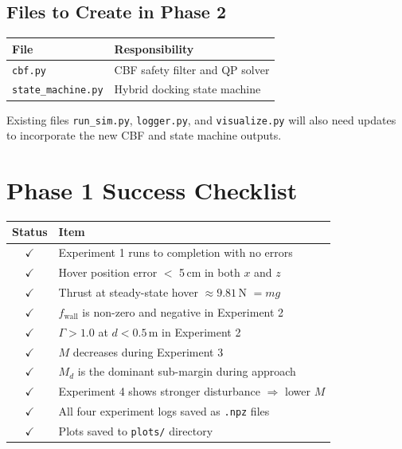 \documentclass[12pt]{article}
\begin{document}
\subsection{Files to Create in Phase 2}

\begin{center}
\begin{tabular}{ll}
\toprule
\textbf{File} & \textbf{Responsibility} \\
\midrule
\texttt{cbf.py}           & CBF safety filter and QP solver \\
\texttt{state\_machine.py} & Hybrid docking state machine \\
\bottomrule
\end{tabular}
\end{center}

Existing files \texttt{run\_sim.py}, \texttt{logger.py}, and
\texttt{visualize.py} will also need updates to incorporate the new
CBF and state machine outputs.

\section{Phase 1 Success Checklist}

\begin{center}
\begin{tabular}{cl}
\toprule
\textbf{Status} & \textbf{Item} \\
\midrule
$\checkmark$ & Experiment 1 runs to completion with no errors \\
$\checkmark$ & Hover position error $<$ 5\,cm in both $x$ and $z$ \\
$\checkmark$ & Thrust at steady-state hover $\approx 9.81$\,N $= mg$ \\
$\checkmark$ & $f_\mathrm{wall}$ is non-zero and negative in Experiment 2 \\
$\checkmark$ & $\Gamma > 1.0$ at $d < 0.5$\,m in Experiment 2 \\
$\checkmark$ & $M$ decreases during Experiment 3 \\
$\checkmark$ & $M_d$ is the dominant sub-margin during approach \\
$\checkmark$ & Experiment 4 shows stronger disturbance $\Rightarrow$ lower $M$ \\
$\checkmark$ & All four experiment logs saved as \texttt{.npz} files \\
$\checkmark$ & Plots saved to \texttt{plots/} directory \\
\bottomrule
\end{tabular}
\end{center}
\end{document}

